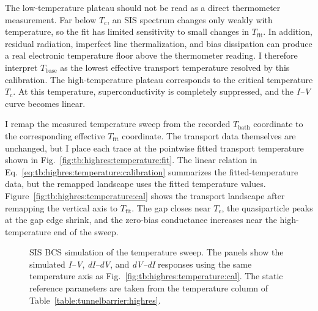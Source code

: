         The low-temperature plateau should not be read as a direct thermometer measurement. Far below $T_\mathrm{c}$, an SIS spectrum changes only weakly with temperature, so the fit has limited sensitivity to small changes in $T_\mathrm{fit}$. In addition, residual radiation, imperfect line thermalization, and bias dissipation can produce a real electronic temperature floor above the thermometer reading. I therefore interpret $T_\mathrm{base}$ as the lowest effective transport temperature resolved by this calibration. The high-temperature plateau corresponds to the critical temperature $T_\mathrm{c}$. At this temperature, superconductivity is completely suppressed, and the \textit{I--V} curve becomes linear.

        I remap the measured temperature sweep from the recorded $T_\mathrm{bath}$ coordinate to the corresponding effective $T_\mathrm{fit}$ coordinate. The transport data themselves are unchanged, but I place each trace at the pointwise fitted transport temperature shown in Fig.~\ref{fig:tb:highres:temperature:fit}. The linear relation in Eq.~\eqref{eq:tb:highres:temperature:calibration} summarizes the fitted-temperature data, but the remapped landscape uses the fitted temperature values. Figure~\ref{fig:tb:highres:temperature:cal} shows the transport landscape after remapping the vertical axis to $T_\mathrm{fit}$. The gap closes near $T_\mathrm{c}$, the quasiparticle peaks at the gap edge shrink, and the zero-bias conductance increases near the high-temperature end of the sweep.

        \begin{figure}[p]
            \centering

            \caption{
                Transport landscape of TB1 as a function of temperature on the remapped $T_\mathrm{fit}$ axis. The three columns show the measured \textit{I--V}, \textit{dI--dV}, and \textit{dV--dI} responses, while the rows show representative traces, a surface view, and a false-color map of the same data.
            }
            \label{fig:tb:highres:temperature:cal}

            \vspace{1em}

            \caption{
                SIS BCS simulation of the temperature sweep. The panels show the simulated \textit{I--V}, \textit{dI--dV}, and \textit{dV--dI} responses using the same temperature axis as Fig.~\ref{fig:tb:highres:temperature:cal}. The static reference parameters are taken from the temperature column of Table~\ref{table:tunnelbarrier:highres}.
            }
            \label{fig:tb:highres:temperature:sim}
        \end{figure}

